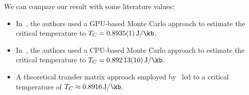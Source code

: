 		We can compare our result with some literature values:
		\begin{itemize}
			\item In~\citet{literature_gpu}, the authors used a GPU-based Monte Carlo approach to estimate the critical temperature to $T_C=\SI{0.8935(1)}{\J\per\kb}$.
			\item In~\citet{literature_cpu}, the authors used a CPU-based Monte Carlo approach to estimate the critical temperature to $T_C=\SI{0.89213(10)}{\J\per\kb}$.
			\item A theoretical transfer matrix approach employed by~\cite{literature_theo} led to a critical temperature of $T_C \approx \SI{0.8916}{\J\per\kb}$.
		\end{itemize}
	

